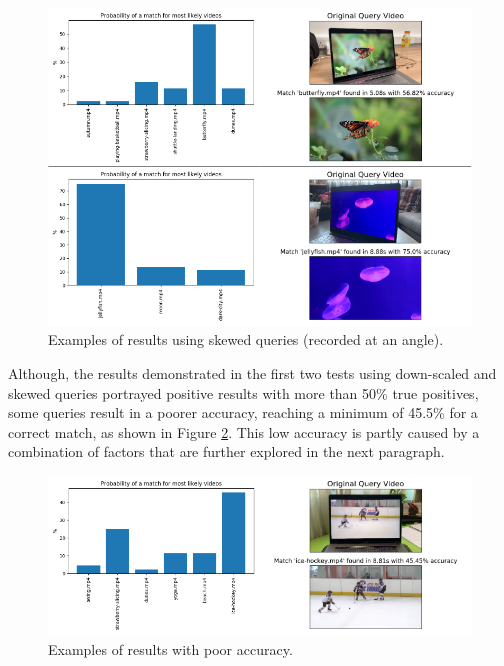 \begin{figure}[h] 
\centerline{\includegraphics[width=\textwidth]{figures/evaluation/skewed-queries.png}}
\caption{\label{fig:evaluation-skewed-queries}Examples of results using skewed queries (recorded at an angle).}
\end{figure}

Although, the results demonstrated in the first two tests using down-scaled and skewed queries portrayed positive results with more than 50\% true positives, some queries result in a poorer accuracy, reaching a minimum of 45.5\% for a correct match, as shown in Figure \ref{fig:evaluation-poor-accuracy-query}. This low accuracy is partly caused by a combination of factors that are further explored in the next paragraph. %

\begin{figure}[h] 
\centerline{\includegraphics[width=\textwidth]{figures/evaluation/poor-accuracy-query.png}}
\caption{\label{fig:evaluation-poor-accuracy-query}Examples of results with poor accuracy.}
\end{figure}

